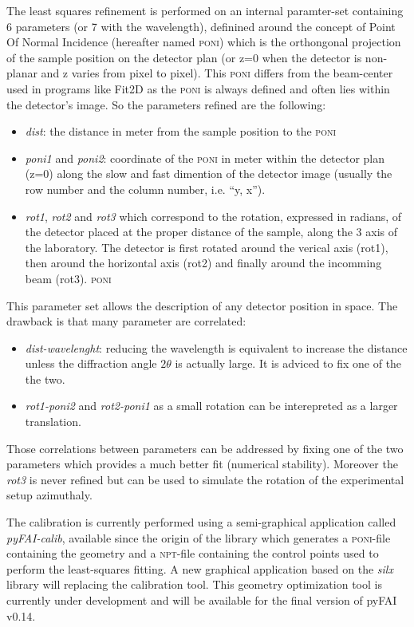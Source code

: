 \documentclass{iucr}              %
\begin{document}
The least squares refinement is performed on an internal paramter-set containing
6  parameters (or 7 with the wavelength), definined around the
concept of Point Of Normal Incidence (hereafter named \textsc{poni}) which is
the orthongonal projection  of the sample position on the detector plan 
(or z=0 when the detector is non-planar and z varies from pixel to pixel).
This \textsc{poni} differs from the beam-center used in programs like
Fit2D\cite{fit2d} as the \textsc{poni} is always defined and often lies within
the detector's image.
So the parameters refined are the following:
\begin{itemize}
  \item \textit{dist}: the distance in meter from the sample position to the
  \textsc{poni}
  \item \textit{poni1} and \textit{poni2}: coordinate of the
  \textsc{poni} in meter within the detector plan (z=0) along the slow and fast
  dimention of the detector image (usually the row number and the column
  number, i.e. ``y, x'').
  \item \textit{rot1}, \textit{rot2} and \textit{rot3} which correspond to the
  rotation, expressed in radians, of the detector placed at the proper
  distance of the sample, along the 3 axis of the laboratory. The detector is
  first rotated around the verical axis (rot1), then around the horizontal axis
  (rot2) and finally around the incomming beam (rot3). 
  \textsc{poni}
\end{itemize}

This parameter set allows the description of any detector position in space.
The drawback is that many parameter are correlated: 
\begin{itemize}
  \item \textit{dist-wavelenght}: reducing the wavelength is equivalent to
  increase the distance unless the diffraction angle $2\theta$ is actually
  large. It is adviced to fix one of the the two. 
  \item \textit{rot1-poni2} and \textit{rot2-poni1} as a small rotation can be
  interepreted as a larger translation. 
\end{itemize}
Those correlations between parameters can be addressed by fixing one of
the two parameters which provides a much better fit (numerical stability).
Moreover the \textit{rot3} is never refined but can be used to simulate the
rotation of the experimental setup azimuthaly.

The calibration is currently performed using a semi-graphical
application called \textit{pyFAI-calib}, available since the origin of the library 
which generates a \textsc{poni}-file containing the geometry and a
\textsc{npt}-file containing the control points used to perform the
least-squares fitting.
A new graphical application based on the \textit{silx}\cite{silx} library will
replacing the calibration tool. 
This geometry optimization tool is currently under development and will be
available for the final version of pyFAI v0.14. 
\end{document}

